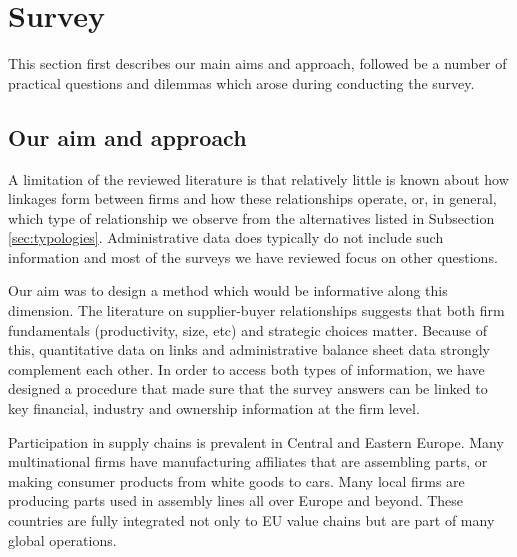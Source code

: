 \documentclass[final, dvipsnames, authoryear,12pt]{elsarticle}
\begin{document}



\section{ Survey}
\label{sec:survey}

This section first describes our main aims and approach, followed be a number of practical questions and dilemmas which arose during conducting the survey.

  
\subsection{Our aim and approach}

A limitation of the reviewed literature is that relatively little is known about how linkages form between firms and how these relationships operate, or, in general, which type of relationship we observe from the alternatives listed in Subsection \ref{sec:typologies}. Administrative data does typically do not include such information and most of the surveys we have reviewed focus on other questions.

Our aim was to design a method which would be informative along this dimension. The literature on supplier-buyer relationships suggests that both firm fundamentals (productivity, size, etc) and strategic choices matter. Because of this, quantitative data on links and administrative balance sheet data strongly complement each other. In order to access both types of information, we have designed a procedure that made sure that the survey answers can be linked to key financial, industry and ownership information at the firm level.

Participation in supply chains is prevalent in Central and Eastern Europe. Many multinational firms have manufacturing affiliates that are assembling parts, or making consumer products from white goods to cars. Many local firms are producing parts used in assembly lines all over Europe and beyond. These countries are fully integrated not only to EU value chains but are part of many global operations. 
\end{document}
